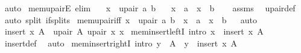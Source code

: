 \begin{isabellebody}
\ auto%
\endisatagproof
{\isafoldproof}%
%
\isadelimproof
%
\endisadelimproof
\isanewline
\isanewline
{}\isamarkupfalse%
\ mem{\isacharunderscore}{\kern0pt}upairE\ {\isacharbrackleft}{\kern0pt}elim{\isacharbang}{\kern0pt}{\isacharbrackright}{\kern0pt}{\isacharcolon}{\kern0pt}\isanewline
\ \ \ {\isachardoublequoteopen}x\ {\isasymin}\ upair\ a\ b{\isachardoublequoteclose}\isanewline
\ \ \ {\isachardoublequoteopen}x\ {\isacharequal}{\kern0pt}\ a{\isachardoublequoteclose}\ {\isacharbar}{\kern0pt}\ {\isachardoublequoteopen}x\ {\isacharequal}{\kern0pt}\ b{\isachardoublequoteclose}\isanewline
%
\isadelimproof
\ \ %
\endisadelimproof
%
\isatagproof
{}\isamarkupfalse%
\ assms\ \isamarkupfalse%
\ upair{\isacharunderscore}{\kern0pt}def\ \isamarkupfalse%
\ {\isacharparenleft}{\kern0pt}auto\ split{\isacharcolon}{\kern0pt}\ if{\isacharunderscore}{\kern0pt}splits{\isacharparenright}{\kern0pt}%
\endisatagproof
{\isafoldproof}%
%
\isadelimproof
\isanewline
%
\endisadelimproof
\isanewline
{}\isamarkupfalse%
\ mem{\isacharunderscore}{\kern0pt}upair{\isacharunderscore}{\kern0pt}iff{\isacharcolon}{\kern0pt}\ {\isachardoublequoteopen}x\ {\isasymin}\ upair\ a\ b\ {\isasymlongleftrightarrow}\ x\ {\isacharequal}{\kern0pt}\ a\ {\isasymor}\ x\ {\isacharequal}{\kern0pt}\ b{\isachardoublequoteclose}%
\isadelimproof
\ %
\endisadelimproof
%
\isatagproof
{}\isamarkupfalse%
\ auto%
\endisatagproof
{\isafoldproof}%
%
\isadelimproof
%
\endisadelimproof
\isanewline
\isanewline
{}\isamarkupfalse%
\ {\isachardoublequoteopen}insert\ x\ A\ {\isasymequiv}\ {\isasymUnion}{\isacharparenleft}{\kern0pt}upair\ A\ {\isacharparenleft}{\kern0pt}upair\ x\ x{\isacharparenright}{\kern0pt}{\isacharparenright}{\kern0pt}{\isachardoublequoteclose}\isanewline
\isanewline
{}\isamarkupfalse%
\ mem{\isacharunderscore}{\kern0pt}insert{\isacharunderscore}{\kern0pt}leftI\ {\isacharbrackleft}{\kern0pt}intro{\isacharbrackright}{\kern0pt}{\isacharcolon}{\kern0pt}\ {\isachardoublequoteopen}x\ {\isasymin}\ insert\ x\ A{\isachardoublequoteclose}\isanewline
%
\isadelimproof
\ \ %
\endisadelimproof
%
\isatagproof
{}\isamarkupfalse%
\ insert{\isacharunderscore}{\kern0pt}def\ \isamarkupfalse%
\ auto%
\endisatagproof
{\isafoldproof}%
%
\isadelimproof
\isanewline
%
\endisadelimproof
{}\isamarkupfalse%
\ mem{\isacharunderscore}{\kern0pt}insert{\isacharunderscore}{\kern0pt}rightI\ {\isacharbrackleft}{\kern0pt}intro{\isacharbrackright}{\kern0pt}{\isacharcolon}{\kern0pt}\ {\isachardoublequoteopen}y\ {\isasymin}\ A\ {\isasymLongrightarrow}\ y\ {\isasymin}\ insert\ x\ A{\isachardoublequoteclose}\isanewline

\end{isabellebody}
